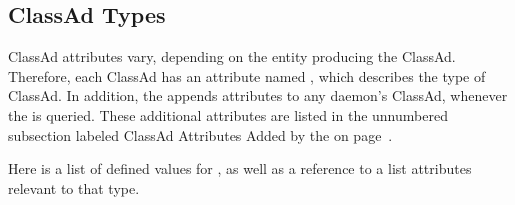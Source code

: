 \subsection*{\label{sec:ClassAd-Types}ClassAd Types}

ClassAd attributes vary, 
depending on the entity producing the ClassAd.
Therefore, each ClassAd has an attribute named ,
which describes the type of ClassAd.
In addition, the  appends attributes to
any daemon's ClassAd, whenever the  is
queried. These additional attributes are listed in
the unnumbered subsection labeled ClassAd Attributes Added by the 
on page~\pageref{sec:Collector-Added-Attributes}.

Here is a list of defined values for ,
as well as a reference to a list attributes relevant to
that type.


